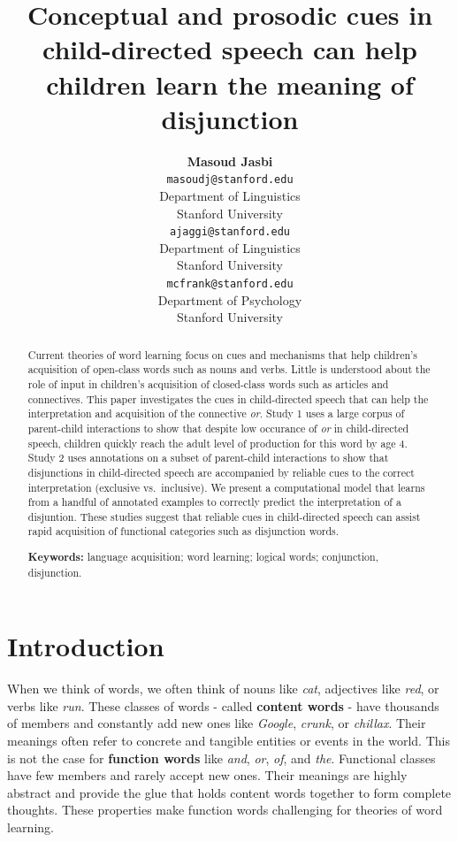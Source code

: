 \documentclass[10pt, letterpaper]{article}
\title{Conceptual and prosodic cues in child-directed speech can help children
learn the meaning of disjunction}
\author{{\large \bf Masoud Jasbi} \\ \texttt{masoudj@stanford.edu} \\ Department of Linguistics \\ Stanford University \And {\large \bf Akshay Jaggi} \\ \texttt{ajaggi@stanford.edu} \\ Department of Linguistics \\ Stanford University \And {\large \bf Michael C. Frank} \\ \texttt{mcfrank@stanford.edu} \\ Department of Psychology \\ Stanford University }
\begin{document}
\maketitle

\begin{abstract}
Current theories of word learning focus on cues and mechanisms that help
children's acquisition of open-class words such as nouns and verbs.
Little is understood about the role of input in children's acquisition
of closed-class words such as articles and connectives. This paper
investigates the cues in child-directed speech that can help the
interpretation and acquisition of the connective \emph{or}. Study 1 uses
a large corpus of parent-child interactions to show that despite low
occurance of \emph{or} in child-directed speech, children quickly reach
the adult level of production for this word by age 4. Study 2 uses
annotations on a subset of parent-child interactions to show that
disjunctions in child-directed speech are accompanied by reliable cues
to the correct interpretation (exclusive vs.~inclusive). We present a
computational model that learns from a handful of annotated examples to
correctly predict the interpretation of a disjuntion. These studies
suggest that reliable cues in child-directed speech can assist rapid
acquisition of functional categories such as disjunction words.

\textbf{Keywords:}
language acquisition; word learning; logical words; conjunction,
disjunction.
\end{abstract}

\section{Introduction}\label{introduction}

When we think of words, we often think of nouns like \emph{cat},
adjectives like \emph{red}, or verbs like \emph{run}. These classes of
words - called \textbf{content words} - have thousands of members and
constantly add new ones like \emph{Google}, \emph{crunk}, or
\emph{chillax}. Their meanings often refer to concrete and tangible
entities or events in the world. This is not the case for
\textbf{function words} like \emph{and}, \emph{or}, \emph{of}, and
\emph{the}. Functional classes have few members and rarely accept new
ones. Their meanings are highly abstract and provide the glue that holds
content words together to form complete thoughts. These properties make
function words challenging for theories of word learning.
\end{document}
